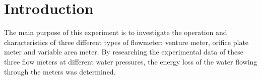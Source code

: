 \section{Introduction}
\label{sec:introduction}
\FloatBarrier %
The main purpose of this experiment is to investigate the operation and characteristics of three different
types of flowmeter: venture meter, orifice plate meter and variable area meter.
By researching the experimental data of these three flow meters at different water pressures, 
the energy loss of the water flowing through the meters was determined.
